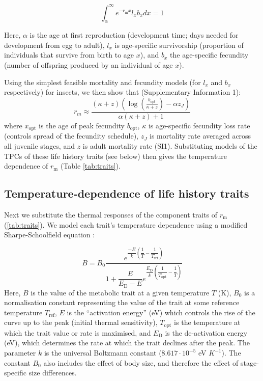 \begin{equation}  \label{eq:EuLot}
	\int_\alpha^\infty  {{e^{ - {r_\text{m}}x}}{l_x}{b_x}dx}  = 1	
\end{equation}

Here, $\alpha$ is the age at first reproduction (development time; days needed for development from egg to adult), $l_x$ is age-specific survivorship (proportion of individuals that survive from birth to age $x$), and $b_x$ the age-specific fecundity (number of offspring produced by an individual of age $x$). 

Using the simplest feasible mortality and fecundity models (for $l_x$ and $b_x$ respectively) for insects, we then show that (Supplementary Information 1):
\begin{equation} \label{eq:rm_app}
	r_m \approx \frac{(\kappa + z)  \left( \log\left(\frac{b_\text{opt}}{\kappa + z} \right) - \alpha z_J\right)}{\alpha (\kappa + z) + 1}
\end{equation}
where $x_\text{opt}$ is the age of peak fecundity $b_\text{opt}$, $\kappa$ is age-specific fecundity loss rate (controls spread of the fecundity  schedule), $z_J$ is mortality rate averaged across all juvenile stages, and $z$ is adult mortality rate (SI1). Substituting models of the TPCs of these life history traits (see below) then gives the temperature dependence of $r_\text{m}$ (Table \ref{tab:traits}).


\subsection*{Temperature-dependence of life history traits}

Next we substitute the thermal responses of the component traits of $r_\text{m}$ (\ref{tab:traits}). We model each trait's temperature dependence using a modified Sharpe-Schoolfield equation \citep{Schoolfield1981}: 
   
\begin{equation} \label{eq:TPCModel}
B = B_0 \dfrac
{	e^{\dfrac{-E_\text{}}{k} \left (\dfrac{1}{T} - 
\dfrac{1}{T_\text{ref}} \right ) } }
{1 + \dfrac{E}{E_\text{D} - E}  e^{\dfrac{E_\text{D}}{k}  
\left (\dfrac{1}{T_\text{opt}} - \dfrac{1}{T} \right )}}
\end{equation}
Here, $B$ is the value of the metabolic trait at a given temperature $T$ (K), $B_{0}$ is a normalisation constant representing the value of the trait at some reference temperature $T_\text{ref}$, $E$ is the ``activation  energy'' (eV) which controls the rise of the curve up to the peak (initial thermal sensitivity), $T_\text{opt}$ is the temperature at which the trait value or rate is maximised, and $E_\text{D}$ is the de-activation energy (eV), which determines the rate at which the trait declines after the peak. The parameter $k$ is the universal Boltzmann constant ($8.617 \cdot 10^{-5}$ eV  $K^{-1}$). The constant $B_0$ also includes the effect of body size, and therefore the effect of stage-specific size differences.       

